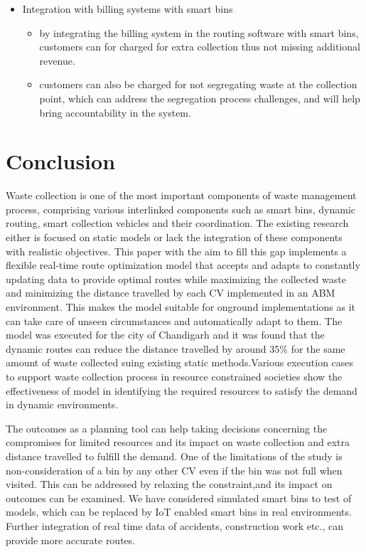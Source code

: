 \documentclass[12pt]{article}
\begin{document}
\begin{itemize}
\begin{itemize}
\begin{itemize}
 \end{itemize}
 \item Integration with billing systems with smart bins
   \begin{itemize}
 \item by integrating the billing system in the routing software with smart bins, customers can for charged for extra collection thus not missing additional revenue. \item customers can also be charged for not segregating waste at the collection point, which can address the segregation process challenges, and will help bring accountability in the system.
\end{itemize}
\end{itemize}
\end{itemize}
\section{Conclusion}
Waste collection is one of the most important components of waste management process, comprising various interlinked components such as smart bins, dynamic routing, smart collection vehicles and their coordination. The existing research either is focused on static models or lack the integration of these components with realistic objectives. This paper with the aim to fill this gap implements a flexible real-time route optimization model that accepts and adapts to constantly updating data to provide optimal routes while maximizing the collected waste and minimizing the distance travelled by each CV implemented in an ABM environment. This makes the model suitable for onground implementations as it can take care of unseen circumstances and automatically adapt to them. The model was executed for the city of Chandigarh and it was found that the dynamic routes can reduce the distance travelled by around 35\% for the same amount of waste collected suing existing static methods.Various execution cases to support waste collection process in resource constrained societies show the effectiveness of model in identifying the required resources to satisfy the demand in dynamic environments. 

The outcomes as a planning tool can help taking decisions concerning the compromises for limited resources and its impact on waste collection and extra distance travelled to fulfill the demand. One of the limitations of the study is non-consideration of a bin by any other CV even if the bin was not full when visited. This can be addressed by relaxing the constraint,and its impact on outcomes can be examined. We have considered simulated smart bins to test of models, which can be replaced by IoT enabled smart bins in real environments. Further integration of real time data of  accidents, construction work etc., can provide more accurate routes.





\end{document}
